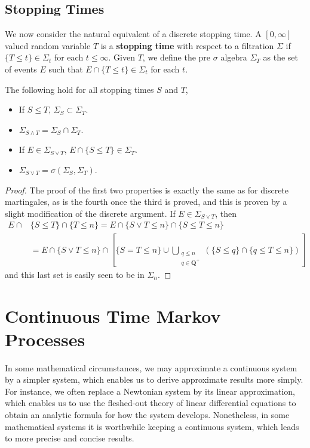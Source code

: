 \section{Stopping Times}

We now consider the natural equivalent of a discrete stopping time. A $[0,\infty]$ valued random variable $T$ is a {\bf stopping time} with respect to a filtration $\Sigma$ if $\{ T \leq t \} \in \Sigma_t$ for each $t \leq \infty$. Given $T$, we define the pre $\sigma$ algebra $\Sigma_T$ as the set of events $E$ such that $E \cap \{ T \leq t \} \in \Sigma_t$ for each $t$.

\begin{lemma}
    The following hold for all stopping times $S$ and $T$,
    \begin{itemize}
        \item If $S \leq T$, $\Sigma_S \subset \Sigma_T$.
        \item $\Sigma_{S \wedge T} = \Sigma_S \cap \Sigma_T$.
        \item If $E \in \Sigma_{S \vee T}$, $E \cap \{ S \leq T \} \in \Sigma_T$.
        \item $\Sigma_{S \vee T} = \sigma(\Sigma_S, \Sigma_T)$.
    \end{itemize}
\end{lemma}
\begin{proof}
    The proof of the first two properties is exactly the same as for discrete martingales, as is the fourth once the third is proved, and this is proven by a slight modification of the discrete argument. If $E \in \Sigma_{S \vee T}$, then
    \begin{align*}
        E \cap &\{ S \leq T \} \cap \{ T \leq n \} = E \cap \{ S \vee T \leq n \} \cap \{ S \leq T \leq n \}\\
        &= E \cap \{ S \vee T \leq n \} \cap \left[ \{ S = T \leq n \} \cup \bigcup_{\substack{q \leq n\\q \in \mathbf{Q}^+}} (\{ S \leq q \} \cap \{ q \leq T \leq n \}) \right]
    \end{align*}
    and this last set is easily seen to be in $\Sigma_n$.
\end{proof}

\chapter{Continuous Time Markov Processes}

In some mathematical circumstances, we may approximate a continuous system by a simpler system, which enables us to derive approximate results more simply. For instance, we often replace a Newtonian system by its linear approximation, which enables us to use the fleshed-out theory of linear differential equations to obtain an analytic formula for how the system develops. Nonetheless, in some mathematical systems it is worthwhile keeping a continuous system, which leads to more precise and concise results.

